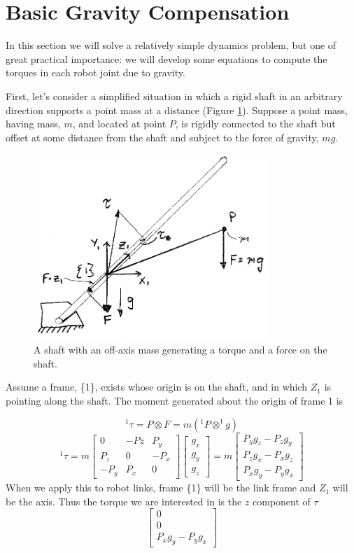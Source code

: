 \section{Basic Gravity Compensation}

In this section we will solve a relatively simple dynamics problem, but one of great practical importance:  we will develop some equations to compute the torques in each robot joint due to gravity.

First, let's consider a simplified situation in which a rigid shaft in an arbitrary direction supports a point mass at a distance (Figure \ref{basicgravitytorque}).   Suppose a point mass, having mass, $m$, and located at point $P$, is rigidly connected to the shaft but offset at some distance from the shaft and subject to the force of gravity, $mg$.

\begin{figure}\centering
   \includegraphics[width=3.5in]{figs06/00857.eps}
\caption{A shaft with an off-axis mass generating a torque and a force on the shaft.}\label{basicgravitytorque}
\end{figure}

Assume a frame, \{1\},  exists whose origin is on the shaft, and in which $Z_1$ is pointing along the shaft.  The moment generated about the origin of frame 1 is

\[
^1\tau =  P\otimes F = m(^1P \otimes ^1g)
\]
\[
^1\tau = m \begin{bmatrix} 0 & -Pz & P_y \\ P_z & 0 & -P_x \\ -P_y & P_x & 0  \end{bmatrix}
\begin{bmatrix} g_x\\g_y\\g_z \end{bmatrix} =
m\begin{bmatrix} P_yg_z-P_zg_y \\P_zg_x-P_xg_z\\P_xg_y-P_yg_x  \end{bmatrix}
\]
When we apply this to robot links, frame \{1\} will be the link frame and $Z_1$ will be the axis.  Thus the torque we are interested in is the $z$ component of $\tau$
\[
\begin{bmatrix}0\\0\\P_xg_y-P_yg_x\end{bmatrix}
\]

